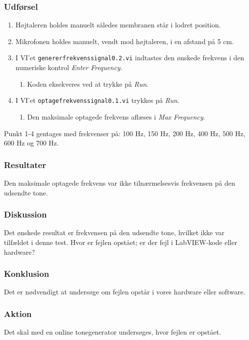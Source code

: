 		\subsubsection{Udførsel}
			\begin{enumerate}
				\item Højtaleren holdes manuelt således membranen står i lodret position. 
				\item Mikrofonen holdes manuelt, vendt mod højtaleren, i en afstand på 5 cm. 
				\item I VI'et \texttt{genererfrekvenssignal0.2.vi} indtastes den ønskede frekvens i den numeriske kontrol \textit{Enter Frequency}. 
					\begin{enumerate}
						\item Koden eksekveres ved at trykke på \textit{Run}. 
					\end{enumerate} 
				\item I VI'et \texttt{optagefrekvenssignal0.1.vi} trykkes på \textit{Run}. 
					\begin{enumerate}
						\item Den maksimale optagede frekvens aflæses i \textit{Max Frequency}. 
					\end{enumerate}	  
			\end{enumerate}
			
			Punkt 1-4 gentages med frekvenser på: 100 Hz, 150 Hz, 200 Hz, 400 Hz, 500 Hz, 600 Hz og 700 Hz. 
			
			\subsubsection{Resultater}
			Den maksimale optagede frekvens var ikke tilnærmelsesvis frekvensen på den udsendte tone.
			\subsubsection{Diskussion}
			Det ønskede resultat er frekvensen på den udsendte tone, hvilket ikke var tilfældet i denne test. Hvor er fejlen opstået; er der fejl i LabVIEW-kode eller hardware? 
			\subsubsection{Konklusion}
			Det er nødvendigt at undersøge om fejlen opstår i vores hardware eller software. 
			\subsubsection{Aktion}
			Det skal med en online tonegenerator undersøges, hvor fejlen er opstået. 

